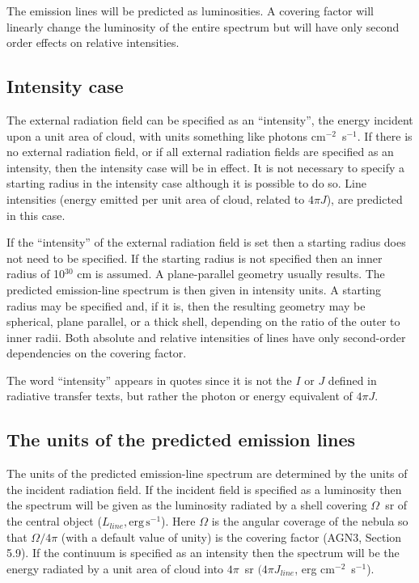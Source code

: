 The emission lines will be predicted as luminosities.
A covering factor will linearly change the luminosity of the entire spectrum
but will have only second order effects on relative intensities.

\subsection{Intensity case}

The external radiation field can be specified as an ``intensity'',
the energy
incident upon a unit area of cloud, with units
something like photons cm$^{-2}$~s$^{-1}$.
If there is no external radiation field, or if all external radiation fields are specified as an intensity,
then the intensity case will be in effect.
It is not necessary to specify a starting radius in the intensity case
although it is possible to do so.
Line intensities (energy emitted per
unit area of cloud, related to $4\pi J$), are predicted in this case.

If the ``intensity'' of the external radiation field is set then a starting radius does not
need to be specified.
If the starting radius is not specified then an inner
radius of 10$^{30}$ cm is assumed.  A plane-parallel geometry usually results.
The predicted emission-line spectrum is then given in intensity units.
A starting radius may be specified and, if it is, then the resulting geometry
may be spherical, plane parallel, or a thick shell, depending on the ratio
of the outer to inner radii.  Both absolute and relative intensities of
lines have only second-order dependencies on the covering factor.

The word ``intensity'' appears in quotes since it is
not the $I$ or $J$ defined in radiative transfer texts, but rather the photon
or energy equivalent of $4\pi J$.

\subsection{The units of the predicted emission lines}

The units of the predicted emission-line spectrum are determined by the
units of the incident radiation field.
If the incident field is specified as a
luminosity then the spectrum will be given as the luminosity radiated by
a shell covering  $\Omega$~sr of the central object ($L_{line}, \mathrm{erg\,
s}^{-1}$).  Here $\Omega$ is the
angular coverage of the nebula so that $\Omega/4\pi$ (with a default value of unity)
is the covering factor (AGN3, Section 5.9).  If the
continuum is specified as an intensity then the spectrum will be the energy
radiated by a unit area of cloud into $4\pi$~sr $(4\pi J_{line}$, erg
cm$^{-2}$~s$^{-1}$).

